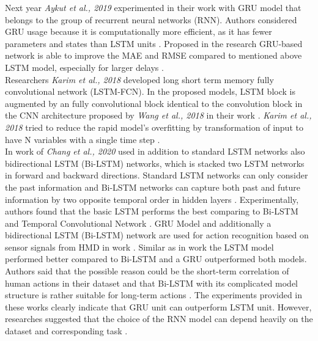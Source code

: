 Next year \textit{Aykut et al., 2019} experimented in their work \cite{telepresence} with GRU model that belongs to the group of recurrent neural networks (RNN). Authors considered GRU usage because it is computationally more efficient, as it has fewer parameters and states than LSTM units \cite{telepresence}. Proposed in the research GRU-based network is able to improve the MAE and RMSE compared to mentioned above LSTM model, especially for larger delays \cite{telepresence}. \\
Researchers \textit{Karim et al., 2018} developed long short term memory fully convolutional network (LSTM-FCN). In the proposed models, LSTM block is augmented by an fully convolutional block \cite{lstm_fcn} identical to the convolution block in the CNN architecture proposed by \textit{Wang et al., 2018} in their work \cite{timeseries_scratch}. \textit{Karim et al., 2018} tried to reduce the rapid model's overfitting by transformation of input to have N variables with a single time step \cite{lstm_fcn}.\\
In work of \textit{Chang et al., 2020} used in addition to standard LSTM networks also bidirectional LSTM (Bi-LSTM) networks, which is stacked two LSTM networks in forward and backward directions. Standard LSTM networks can only consider the past information and Bi-LSTM networks can capture both past and future information by two opposite temporal order in hidden layers \cite{6DoF_Tracking}. Experimentally, authors found that the basic LSTM performs the best comparing to Bi-LSTM and Temporal Convolutional Network  \cite{6DoF_Tracking}.
GRU Model and additionally a bidirectional LSTM (Bi-LSTM) network are used for action recognition based on sensor signals from HMD in work \cite{action_recognition}. Similar as in work \cite{6DoF_Tracking} the LSTM model performed better compared to Bi-LSTM and a GRU outperformed both models. Authors said that the possible reason could be the short-term correlation of human actions in their dataset and that Bi-LSTM with its complicated model structure is rather suitable for long-term actions \cite{action_recognition}. The experiments provided in these works clearly indicate that GRU unit can outperform LSTM unit. However, researches suggested that the choice of the RNN model can depend heavily on the dataset and corresponding task \cite{empirical_evaluation}.